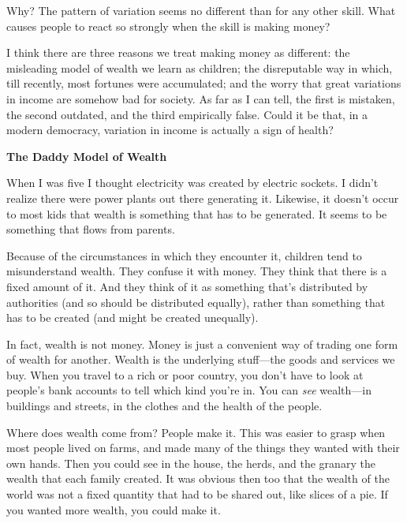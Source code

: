 \documentclass[12pt]{book}
\begin{document}
Why? The pattern of variation seems no different than for any other
skill. What causes people to react so strongly when the skill is making
money?

I think there are three reasons we treat making money as different: the
misleading model of wealth we learn as children; the disreputable way in
which, till recently, most fortunes were accumulated; and the worry that
great variations in income are somehow bad for society. As far as I can
tell, the first is mistaken, the second outdated, and the third
empirically false. Could it be that, in a modern democracy, variation in
income is actually a sign of health?

\textbf{The Daddy Model of Wealth}

When I was five I thought electricity was created by electric sockets. I
didn't realize there were power plants out there generating it.
Likewise, it doesn't occur to most kids that wealth is something that
has to be generated. It seems to be something that flows from parents.

Because of the circumstances in which they encounter it, children tend
to misunderstand wealth. They confuse it with money. They think that
there is a fixed amount of it. And they think of it as something that's
distributed by authorities (and so should be distributed equally),
rather than something that has to be created (and might be created
unequally).

In fact, wealth is not money. Money is just a convenient way of trading
one form of wealth for another. Wealth is the underlying stuff---the
goods and services we buy. When you travel to a rich or poor country,
you don't have to look at people's bank accounts to tell which kind
you're in. You can \emph{see} wealth---in buildings and streets, in the
clothes and the health of the people.

Where does wealth come from? People make it. This was easier to grasp
when most people lived on farms, and made many of the things they wanted
with their own hands. Then you could see in the house, the herds, and
the granary the wealth that each family created. It was obvious then too
that the wealth of the world was not a fixed quantity that had to be
shared out, like slices of a pie. If you wanted more wealth, you could
make it.
\end{document}
